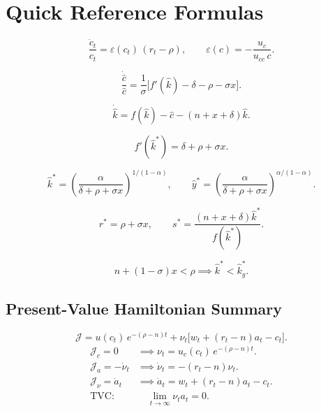 \documentclass[a4paper,11pt]{article}
\newcommand{\khat}{\hat{k}}
\newcommand{\chat}{\hat{c}}
\newcommand{\yhat}{\hat{y}}
\begin{document}
\section{Quick Reference Formulas}

\begin{keyformulabox}[title={Euler Equation (general)}]
\[
  \frac{\dot{c}_t}{c_t} = \varepsilon(c_t)\,(r_t - \rho), \qquad
  \varepsilon(c) = -\frac{u_c}{u_{cc}\,c}.
\]
\end{keyformulabox}

\begin{keyformulabox}[title={Euler Equation (CRRA, per-eff.-worker)}]
\[
  \frac{\dot{\chat}}{\chat} = \frac{1}{\sigma}\bigl[f'(\khat) - \delta - \rho - \sigma x\bigr].
\]
\end{keyformulabox}

\begin{keyformulabox}[title={Capital Accumulation (per-eff.-worker)}]
\[
  \dot{\khat} = f(\khat) - \chat - (n+x+\delta)\khat.
\]
\end{keyformulabox}

\begin{keyformulabox}[title={Modified Golden Rule}]
\[
  f'(\khat^*) = \delta + \rho + \sigma x.
\]
\end{keyformulabox}

\begin{keyformulabox}[title={Cobb-Douglas Steady State ($f(\khat)=\khat^\alpha$)}]
\[
  \khat^* = \left(\frac{\alpha}{\delta+\rho+\sigma x}\right)^{\!\!1/(1-\alpha)}, \qquad
  \yhat^* = \left(\frac{\alpha}{\delta+\rho+\sigma x}\right)^{\!\!\alpha/(1-\alpha)}.
\]
\end{keyformulabox}

\begin{keyformulabox}[title={Steady-State Interest Rate and Savings}]
\[
  r^* = \rho + \sigma x, \qquad
  s^* = \frac{(n+x+\delta)\khat^*}{f(\khat^*)}.
\]
\end{keyformulabox}

\begin{keyformulabox}[title={TVC / No-Dynamic-Inefficiency Condition}]
\[
  n + (1-\sigma)x < \rho \implies \khat^* < \khat_g^*.
\]
\end{keyformulabox}

\subsection*{Present-Value Hamiltonian Summary}
\[
  \mathcal{J} = u(c_t)\,e^{-(\rho-n)t} + \nu_t\bigl[w_t + (r_t - n)a_t - c_t\bigr].
\]
\begin{align*}
  \mathcal{J}_c = 0 &\implies \nu_t = u_c(c_t)\,e^{-(\rho-n)t}. \\
  \mathcal{J}_a = -\dot{\nu}_t &\implies \dot{\nu}_t = -(r_t - n)\nu_t. \\
  \mathcal{J}_\nu = \dot{a}_t &\implies \dot{a}_t = w_t + (r_t-n)a_t - c_t. \\
  \text{TVC:} &\quad \lim_{t\to\infty} \nu_t a_t = 0.
\end{align*}
\end{document}
